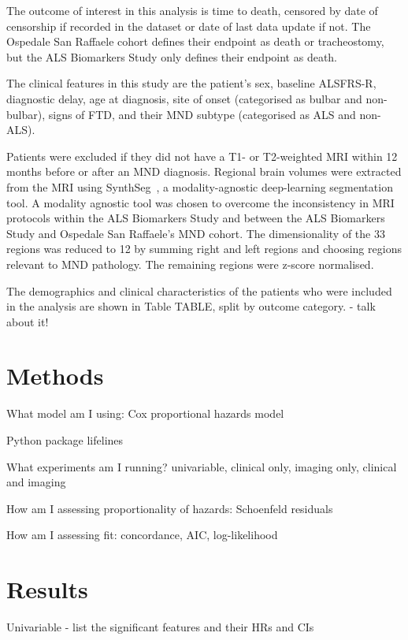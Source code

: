 The outcome of interest in this analysis is time to death, censored by date of censorship if recorded in the dataset or date of last data update if not.
The Ospedale San Raffaele cohort defines their endpoint as death or tracheostomy, but the ALS Biomarkers Study only defines their endpoint as death.

The clinical features in this study are the patient's sex, baseline ALSFRS-R, diagnostic delay, age at diagnosis, site of onset (categorised as bulbar and non-bulbar), signs of FTD, and their MND subtype (categorised as ALS and non-ALS).

Patients were excluded if they did not have a T1- or T2-weighted MRI within 12 months before or after an MND diagnosis.
Regional brain volumes were extracted from the MRI using SynthSeg~\cite{billotSynthSegDomainRandomisation2021}, a modality-agnostic deep-learning segmentation tool.
A modality agnostic tool was chosen to overcome the inconsistency in MRI protocols within the ALS Biomarkers Study and between the ALS Biomarkers Study and Ospedale San Raffaele's MND cohort.
The dimensionality of the 33 regions was reduced to 12 by summing right and left regions and choosing regions relevant to MND pathology.
The remaining regions were z-score normalised.

The demographics and clinical characteristics of the patients who were included in the analysis are shown in Table TABLE, split by outcome category.
- talk about it!

\section{Methods}

What model am I using: Cox proportional hazards model

Python package lifelines

What experiments am I running? univariable, clinical only, imaging only, clinical and imaging

How am I assessing proportionality of hazards: Schoenfeld residuals

How am I assessing fit: concordance, AIC, log-likelihood

\section{Results}



Univariable
- list the significant features and their HRs and CIs

